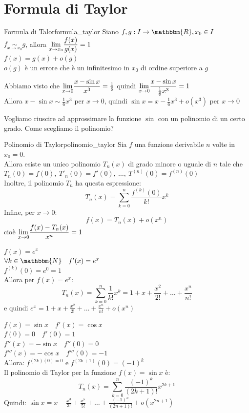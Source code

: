 \documentclass[12pt]{report}
\newcounter{theorem}
\newcommand{\nmu}{}
\begin{document}
  	\section{Formula di Taylor}
  	\begin{theorem}{\nmu Formula di Talor}{formula_taylor}
  		Siano $f, g: I \to \mathbbm{R}, x_0 \in I$ \\
  		$f \underset{x \to x_0}{\sim} g$, allora $\mathlarger{\lim_{x \to {x_0}}}\dfrac{f(x)}{g(x)} = 1$ \\
  		$f(x) = g(x) + o(g)$ \\
  		$o(g)$ è un errore che è un infinitesimo in $x_0$ di ordine superiore a $g$
  	\end{theorem}
  	\begin{example}{}{}
  		Abbiamo visto che $\mathlarger{\lim_{x \to 0}}\dfrac{x - \sin x}{x^3} = \frac{1}{6}$ quindi $\mathlarger{\lim_{x \to 0}}\dfrac{x - \sin x}{\frac{1}{6}x^3} = 1$ \\
  		Allora $x - \sin x \sim \frac{1}{6}x^3$ per $x \to 0$, quindi $\sin x = x - \frac{1}{6}x^3 + o(x^3)$ per $x \to 0$
  	\end{example}
  	Vogliamo riuscire ad approssimare la funzione $\sin$ con un polinomio di un certo grado. Come scegliamo il polinomio?
  	\begin{theorem}{\nmu Polinomio di Taylor}{polinomio_taylor}
  		Sia $f$ una funzione derivabile $n$ volte in $x_0 = 0$. \\
  		Allora esiste un unico polinomio $T_n(x)$ di grado minore o uguale di $n$ tale che $T_n(0) = f(0),\ T'_n(0) = f'(0),\ \dots,\ T^{(n)}(0) = f^{(n)}(0)$ \\
  		Inoltre, il polinomio $T_n$ ha questa espressione:
  		\[
  		T_n(x) = \sum_{k=0}^{n}\dfrac{f^{(k)}(0)}{k!}x^k
  		\]
  		Infine, per $x\to0$:
  		\[
  		f(x) = T_n(x) + o(x^n)
  		\]
  		cioè $\mathlarger{\lim_{x \to 0}}\dfrac{f(x) - T_n(x)}{x^n} = 1$
  	\end{theorem}
  	\begin{example}{}{}
  		$f(x) = e^x$ \\
  		$\forall k \in \mathbbm{N} \quad f'(x) = e^x$ \\
  		$f^{(k)}(0) = e^0 = 1$ \\
  		Allora per $f(x) = e^x$:
  		\[
  		T_n(x) = \sum_{k=0}^{n}\dfrac{1}{k!}x^k = 1 + x + \frac{x^2}{2!} + \dots  + \frac{x^n}{n!}
  		\]
  		e quindi $e^x = 1 + x + \frac{x^2}{2!} + \dots + \frac{x^n}{n!} + o(x^n)$
  	\end{example}
  	\begin{example}{}{}
  		$f(x) = \sin x \quad f'(x) = \cos x$ \\
  		$f(0) = 0 \quad f'(0) = 1$ \\
  		$f''(x) = -\sin x \quad f''(0) = 0$ \\
  		$f'''(x) = -\cos x \quad f'''(0) = -1$ \\
  		Allora: $f^{(2k)(0) = 0}$ e $f^{(2k + 1)}(0) = (-1)^k$ \\
  		Il polinomio di Taylor per la funzione $f(x) = \sin x$ è:
  		\[
  		T_n(x) = \sum_{k = 0}^{n}\dfrac{(-1)^k}{(2k + 1)!}x^{2k + 1}
  		\]
  		Quindi: $\sin x = x - \frac{x^3}{3!} + \frac{x^5}{5!} + \dots + \frac{(-1)^n}{(2n + 1)!} + o(x^{2n+1})$
  	\end{example}
\end{document}
